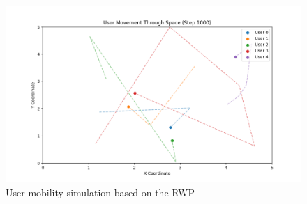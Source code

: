 \begin{figure}
    \centering
    \includegraphics[width=1\linewidth]{Figures/mobility-plot-2025-04-28-15-30-46.png}
    \caption{User mobility simulation based on the RWP}
    \label{fig:mod-user-mob}
\end{figure}
